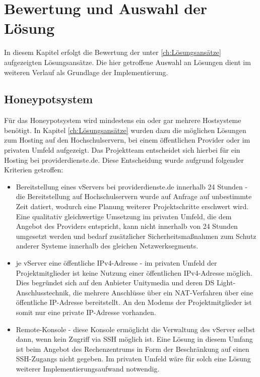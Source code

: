 \chapter{Bewertung und Auswahl der Lösung}
\label{ch:Bewertung und Auswahl der Lösung}

In diesem Kapitel erfolgt die Bewertung der unter \ref{ch:Lösungsansätze} aufgezeigten Lösungsansätze. Die hier getroffene Auswahl an Lösungen dient im weiteren Verlauf als Grundlage der Implementierung.\\

\section{Honeypotsystem}
\label{sec:Honeypotsystem}

Für das Honeypotsystem wird mindestens ein oder gar mehrere Hostsysteme benötigt. In Kapitel \ref{ch:Lösungsansätze} wurden dazu die möglichen Lösungen zum Hosting auf den Hochschulservern, bei einem öffentlichen Provider oder im privaten Umfeld aufgezeigt. Das Projektteam entscheidet sich hierbei für ein Hosting bei providerdienste.de. Diese Entscheidung wurde aufgrund folgender Kriterien getroffen:

\begin{itemize}
\item Bereitstellung eines vServers bei providerdienste.de innerhalb 24 Stunden - die Bereitstellung auf Hochschulservern wurde auf Anfrage auf unbestimmte Zeit datiert, wodurch eine Planung weiterer Projektschritte erschwert wird. Eine qualitativ gleichwertige Umsetzung im privaten Umfeld, die dem Angebot des Providers entspricht, kann nicht innerhalb von 24 Stunden umgesetzt werden und bedarf zusätzlicher Sicherheitsmaßnahmen zum Schutz anderer Systeme innerhalb des gleichen Netzwerksegments.
\item je vServer eine öffentliche IPv4-Adresse - im privaten Umfeld der Projektmitglieder ist keine Nutzung einer öffentlichen IPv4-Adresse möglich. Dies begründet sich auf den Anbieter Unitymedia und deren DS Light-Anschlusstechnik, die mehrere Anschlüsse über ein NAT-Verfahren über eine öffentliche IP-Adresse bereitstellt. An den Modems der Projektmitglieder ist somit nur eine private IP-Adresse vorhanden.
\item Remote-Konsole - diese Konsole ermöglicht die Verwaltung des vServer selbst dann, wenn kein Zugriff via SSH möglich ist. Eine Lösung in diesem Umfang ist beim Angebot des Rechenzentrums in Form der Beschränkung auf einen SSH-Zugangs nicht gegeben. Im privaten Umfeld wäre für solch eine Lösung weiterer Implementierungsaufwand notwendig.
\end{itemize}

